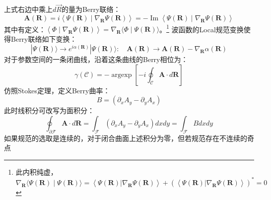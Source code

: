 \documentclass[12pt, a4paper, oneside]{ctexbook}
\begin{document}
	上式右边中乘上$ d\vec{R} $的量为Berry联络：
	\begin{equation}
		\mathbf{A}(\mathbf{R})=i\left\langle\Psi(\mathbf{R}) \mid \nabla_{\mathbf{R}} \Psi(\mathbf{R})\right\rangle=-\operatorname{Im}\left\langle\Psi(\mathbf{R}) \mid \nabla_{\mathbf{R}} \Psi(\mathbf{R})\right\rangle
	\end{equation} 
	其中有定义：$ \left\langle\Phi \mid \nabla_{\mathbf{R}} \Psi(\mathbf{R})\right\rangle=\nabla_{\mathbf{R}}\langle\Phi \mid \Psi(\mathbf{R})\rangle $。\footnote{此内积纯虚，$ \nabla_{\mathbf{R}}\langle\Psi(\mathbf{R}) \mid \Psi(\mathbf{R})\rangle=\left\langle\Psi(\mathbf{R})|\nabla_{\mathbf{R}} \Psi(\mathbf{R})\right\rangle+(\left\langle\Psi(\mathbf{R})|\nabla_{\mathbf{R}} \Psi(\mathbf{R})\right\rangle)^*=0 $ }
	波函数的Local规范变换使得Berry联络如下变换：
	\begin{equation}
		|\Psi(\mathbf{R})\rangle \rightarrow e^{i \alpha(\mathbf{R})}|\Psi(\mathbf{R})\rangle: \quad \mathbf{A}(\mathbf{R}) \rightarrow \mathbf{A}(\mathbf{R})-\nabla_{\mathbf{R}} \alpha(\mathbf{R})
	\end{equation} 
	对于参数空间的一条闭曲线，沿着这条曲线的Berry相位为：
	\begin{equation}
		\gamma(\mathscr{C})=-\operatorname{argexp}\left[-i \oint_{\mathscr{C}} \mathbf{A} \cdot d \mathbf{R}\right]
	\end{equation}
	仿照Stokes定理，定义Berry曲率：
	\begin{equation}
		B=\left(\partial_x A_y-\partial_y A_x\right)
	\end{equation}
	此时线积分可改写为面积分：
	\begin{equation}
		\oint_{\partial \mathscr{F}} \mathbf{A} \cdot d \mathbf{R}=\int_{\mathscr{F}}\left(\partial_x A_y-\partial_y A_x\right) d x d y=\int_{\mathscr{F}} B d x d y
	\end{equation}
	如果规范的选取是连续的，对于闭合曲面上述积分为零，但若规范存在不连续的奇点
	
	
\end{document}
